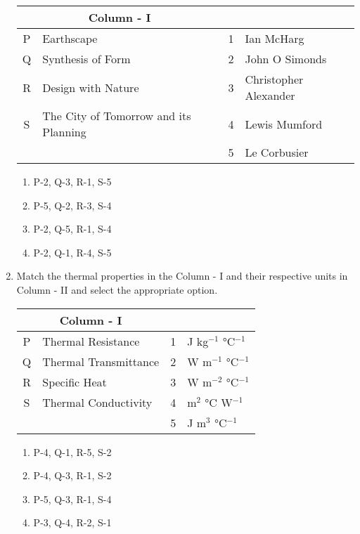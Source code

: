 \documentclass[12pt]{article}
\begin{document}
\begin{enumerate}[label=Q.\arabic*,start=26]
\begin{center}
\begin{tabular}{|c|>{\raggedright\arraybackslash}p{5.8cm}|c|>{\raggedright\arraybackslash}p{5.8cm}|}
				\hline
				\multicolumn{2}{|c|}{\textbf{Column - I}} & \multicolumn{2}{c|}{\textbf{Column - II}} \\
				\hline
				P & Earthscape & 1 & Ian McHarg \\ 
				\hline
				Q & Synthesis of Form & 2 & John O Simonds \\
				\hline
				R & Design with Nature & 3 & Christopher Alexander \\
				\hline
				S & The City of Tomorrow and its Planning & 4 & Lewis Mumford \\
				\hline
				&  & 5 & Le Corbusier \\
				\hline
			\end{tabular}
		\end{center}
		\begin{multicols}{2}
			\begin{enumerate}
				\item P-2, Q-3, R-1, S-5
				\item P-5, Q-2, R-3, S-4
				\item P-2, Q-5, R-1, S-4
				\item P-2, Q-1, R-4, S-5
			\end{enumerate}
		\end{multicols}
	\item Match the thermal properties in the Column - I and their respective units in Column - II and select the appropriate option.


		\begin{center}
			\begin{tabular}{|c|>{\raggedright\arraybackslash}p{5.8cm}|c|>{\raggedright\arraybackslash}p{5.8cm}|}
				\hline
				\multicolumn{2}{|c|}{\textbf{Column - I}} & \multicolumn{2}{c|}{\textbf{Column - II}} \\
				\hline
				P & Thermal Resistance & 1 & J kg$^{-1}$ °C$^{-1}$ \\
				\hline
				Q & Thermal Transmittance & 2 & W m$^{-1}$ °C$^{-1}$ \\
				\hline
				R & Specific Heat & 3 & W m$^{-2}$ °C$^{-1}$ \\
				\hline
				S & Thermal Conductivity & 4 & m$^{2}$ °C W$^{-1}$ \\
				\hline
				&  & 5 & J m$^{3}$ °C$^{-1}$ \\
				\hline
			\end{tabular}
		\end{center}

		\begin{multicols}{2}
			\begin{enumerate}
				\item P-4, Q-1, R-5, S-2
				\item P-4, Q-3, R-1, S-2
				\item P-5, Q-3, R-1, S-4
				\item P-3, Q-4, R-2, S-1
			\end{enumerate}
		\end{multicols}



\end{enumerate}
\end{document}
